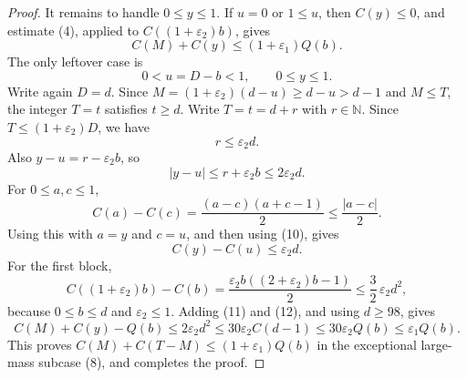 \begin{proof}
It remains to handle \(0\le y\le1\).  If \(u=0\) or \(1\le u\), then
\(C(y)\le0\), and estimate (4), applied to
\(C((1+\varepsilon_2)b)\), gives
\[
C(M)+C(y)\le(1+\varepsilon_1)Q(b).
\]
The only leftover case is
\[
0<u=D-b<1,\qquad 0\le y\le1. \tag{8}
\]
Write again \(D=d\).  Since \(M=(1+\varepsilon_2)(d-u)\ge d-u>d-1\) and
\(M\le T\), the integer \(T=t\) satisfies \(t\ge d\).  Write
\(T=t=d+r\) with \(r\in\mathbb N\).  Since
\(T\le(1+\varepsilon_2)D\), we have
\[
r\le\varepsilon_2 d. \tag{9}
\]
Also \(y-u=r-\varepsilon_2b\), so
\[
|y-u|\le r+\varepsilon_2b\le2\varepsilon_2d. \tag{10}
\]
For \(0\le a,c\le1\),
\[
C(a)-C(c)=\frac{(a-c)(a+c-1)}2\le\frac{|a-c|}{2}.
\]
Using this with \(a=y\) and \(c=u\), and then using (10), gives
\[
C(y)-C(u)\le\varepsilon_2d. \tag{11}
\]
For the first block,
\[
C((1+\varepsilon_2)b)-C(b)
=\frac{\varepsilon_2b((2+\varepsilon_2)b-1)}2
\le\frac32\,\varepsilon_2d^2, \tag{12}
\]
because \(0\le b\le d\) and \(\varepsilon_2\le1\).  Adding (11) and (12),
and using \(d\ge98\), gives
\[
C(M)+C(y)-Q(b)\le 2\varepsilon_2d^2
\le 30\varepsilon_2 C(d-1)
\le 30\varepsilon_2 Q(b)
\le \varepsilon_1 Q(b).
\]
This proves \(C(M)+C(T-M)\le(1+\varepsilon_1)Q(b)\) in the exceptional
large-mass subcase (8), and completes the proof.
\end{proof}
